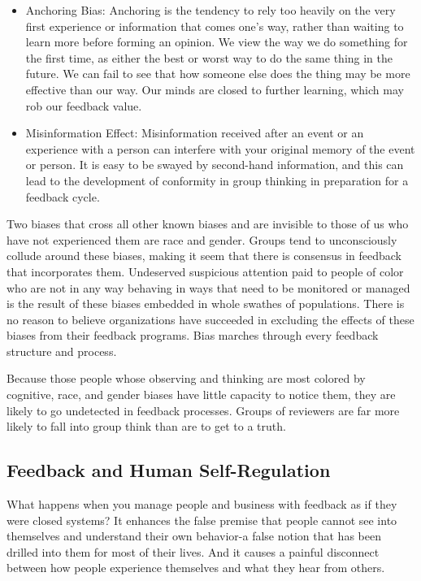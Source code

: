 \documentclass[ebook,12pt,oneside,openany]{memoir}
\begin{document}
\begin{itemize}
    \item Anchoring Bias: Anchoring is the tendency to rely too heavily on the very first experience or information that comes one's way, rather than waiting to learn more before forming an opinion. We view the way we do something for the first time, as either the best or worst way to do the same thing in the future. We can fail to see that how someone else does the thing may be more effective than our way. Our minds are closed to further learning, which may rob our feedback value.
    \item Misinformation Effect: Misinformation received after an event or an experience with a person can interfere with your original memory of the event or person. It is easy to be swayed by second-hand information, and this can lead to the development of conformity in group thinking in preparation for a feedback cycle.
\end{itemize}

Two biases that cross all other known biases and are invisible to those of us who have not experienced them are race and gender. Groups tend to unconsciously collude around these biases, making it seem that there is consensus in feedback that incorporates them.
Undeserved suspicious attention paid to people of color who are not in any way behaving in ways that need to be monitored or managed is the result of these biases embedded in whole swathes of populations. There is no reason to believe organizations have succeeded in excluding the effects of these biases from their feedback programs.
Bias marches through every feedback structure and process. 

Because those people whose observing and thinking are most colored by cognitive, race, and gender biases have little capacity to notice them, they are likely to go undetected in feedback processes. Groups of reviewers are far more likely to fall into group think than are to get to a truth.

\subsection{Feedback and Human Self-Regulation}
What happens when you manage people and business with feedback as if they were closed systems? It enhances the false premise that people cannot see into themselves and understand their own behavior-a false notion that has been drilled into them for most of their lives.
And it causes a painful disconnect between how people experience themselves and what they hear from others.
\end{document}
